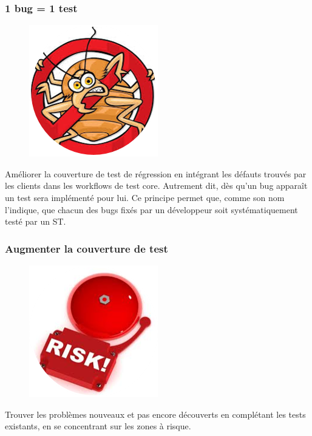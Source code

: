 \subsubsection{1 bug = 1 test}
\begin{figure}[H]
  \centering
      \includegraphics{images/bugtest.png}
\end{figure}
Améliorer la couverture de test de régression en intégrant les défauts trouvés par les clients dans les workflows de test core. Autrement dit, dès qu'un bug appara\^{i}t un test sera implémenté pour lui. Ce principe permet que, comme son nom l'indique, que chacun des bugs fix\'{e}s par un d\'{e}veloppeur soit syst\'{e}matiquement test\'{e} par un ST.

\subsubsection{Augmenter la couverture de test}
\begin{figure}[H]
  \centering
      \includegraphics{images/testcoverage.png}
\end{figure}
Trouver les problèmes nouveaux et pas encore découverts en complétant les tests existants, en se concentrant sur les zones à risque.

